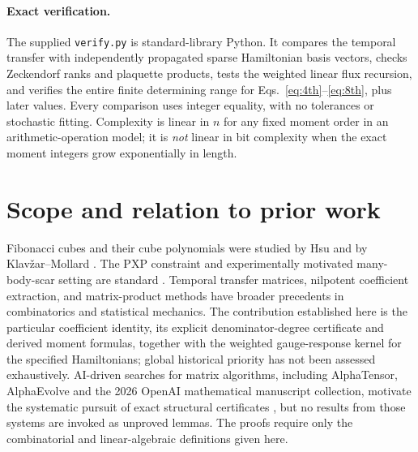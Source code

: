 \documentclass[10pt,a4paper]{article}
\begin{document}
\paragraph{Exact verification.}
The supplied \texttt{verify.py} is standard-library Python. It compares the temporal transfer with independently propagated sparse Hamiltonian basis vectors, checks Zeckendorf ranks and plaquette products, tests the weighted linear flux recursion, and verifies the entire finite determining range for Eqs.~\eqref{eq:4th}--\eqref{eq:8th}, plus later values. Every comparison uses integer equality, with no tolerances or stochastic fitting. Complexity is linear in $n$ for any fixed moment order in an arithmetic-operation model; it is \emph{not} linear in bit complexity when the exact moment integers grow exponentially in length.

\section{Scope and relation to prior work}
Fibonacci cubes and their cube polynomials were studied by Hsu and by Klav\v{z}ar--Mollard \cite{hsu,cubepoly}. The PXP constraint and experimentally motivated many-body-scar setting are standard \cite{turner}. Temporal transfer matrices, nilpotent coefficient extraction, and matrix-product methods have broader precedents in combinatorics and statistical mechanics. The contribution established here is the particular coefficient identity, its explicit denominator-degree certificate and derived moment formulas, together with the weighted gauge-response kernel for the specified Hamiltonians; global historical priority has not been assessed exhaustively. AI-driven searches for matrix algorithms, including AlphaTensor, AlphaEvolve and the 2026 OpenAI mathematical manuscript collection, motivate the systematic pursuit of exact structural certificates \cite{alphatensor,alphaevolve,openaimath}, but no results from those systems are invoked as unproved lemmas. The proofs require only the combinatorial and linear-algebraic definitions given here.
\end{document}
